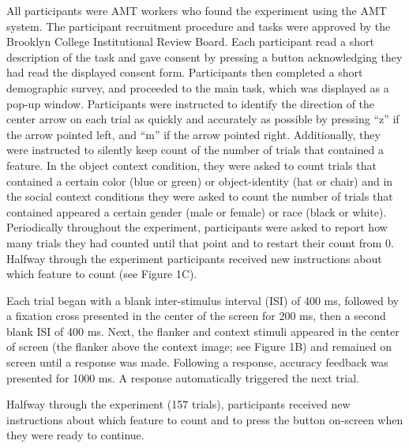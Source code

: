 \documentclass[english,,man,floatsintext]{apa6}
\begin{document}
All participants were AMT workers who found the experiment using the AMT system. The participant recruitment procedure and tasks were approved by the Brooklyn College Institutional Review Board. Each participant read a short description of the task and gave consent by pressing a button acknowledging they had read the displayed consent form. Participants then completed a short demographic survey, and proceeded to the main task, which was displayed as a pop-up window. Participants were instructed to identify the direction of the center arrow on each trial as quickly and accurately as possible by pressing \enquote{z} if the arrow pointed left, and \enquote{m} if the arrow pointed right. Additionally, they were instructed to silently keep count of the number of trials that contained a feature. In the object context condition, they were asked to count trials that contained a certain color (blue or green) or object-identity (hat or chair) and in the social context conditions they were asked to count the number of trials that contained appeared a certain gender (male or female) or race (black or white). Periodically throughout the experiment, participants were asked to report how many trials they had counted until that point and to restart their count from 0. Halfway through the experiment participants received new instructions about which feature to count (see Figure 1C).

Each trial began with a blank inter-stimulus interval (ISI) of 400 ms, followed by a fixation cross presented in the center of the screen for 200 ms, then a second blank ISI of 400 ms. Next, the flanker and context stimuli appeared in the center of screen (the flanker above the context image; see Figure 1B) and remained on screen until a response was made. Following a response, accuracy feedback was presented for 1000 ms. A response automatically triggered the next trial.

Halfway through the experiment (157 trials), participants received new instructions about which feature to count and to press the button on-screen when they were ready to continue.
\end{document}
